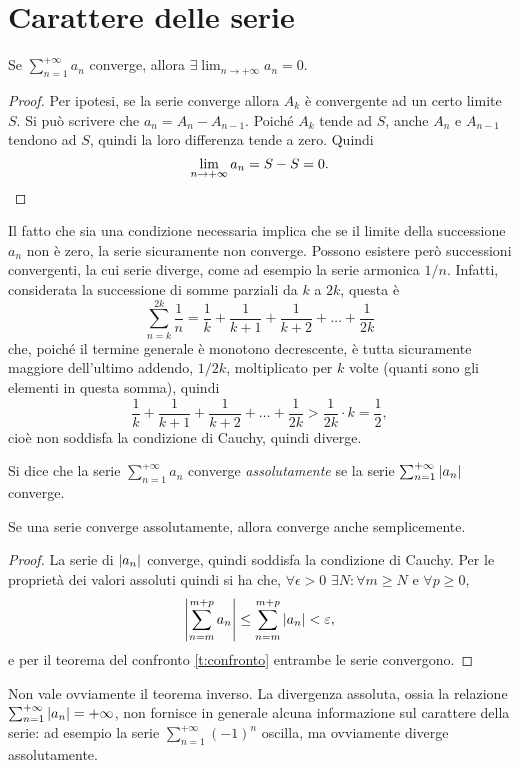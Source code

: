 \section{Carattere delle serie}
\begin{teorema}
Se $\sum_{n=1}^{+\infty}a_n$ converge, allora $\exists\lim_{n\to+\infty}a_n=0$.
\end{teorema}
\begin{proof}
Per ipotesi, se la serie converge allora $A_k$ è convergente ad un certo limite $S$. Si può scrivere che $a_n=A_n-A_{n-1}$. Poiché $A_k$ tende ad $S$, anche $A_n$ e $A_{n-1}$ tendono ad $S$, quindi la loro differenza tende a zero. Quindi
\[
\lim_{n\to+\infty}a_n=S-S=0.\qedhere
\]
\end{proof}
Il fatto che sia una condizione necessaria implica che se il limite della successione $a_n$ non è zero, la serie sicuramente non converge. Possono esistere però successioni convergenti, la cui serie diverge, come ad esempio la serie armonica $1/n$. Infatti, considerata la successione di somme parziali da $k$ a $2k$, questa è
\[
\sum_{n=k}^{2k}\frac1{n}=\frac1{k}+\frac1{k+1}+\frac1{k+2}+\dots+\frac1{2k}
\]
che, poiché il termine generale è monotono decrescente, è tutta sicuramente maggiore dell'ultimo addendo, $1/2k$, moltiplicato per $k$ volte (quanti sono gli elementi in questa somma), quindi
\[
\frac1{k}+\frac1{k+1}+\frac1{k+2}+\dots+\frac1{2k}>\frac1{2k}\cdot k=\frac12,
\]
cioè non soddisfa la condizione di Cauchy, quindi diverge.
\begin{definizione}
\label{d:conv_assoluta}
Si dice che la serie $\sum_{n=1}^{+\infty}a_n$ converge \emph{assolutamente} se la serie $\sum_{n=1}^{+\infty}\left|{a_n}\right|$ converge.
\end{definizione}
\begin{teorema}
Se una serie converge assolutamente, allora converge anche semplicemente.
\end{teorema}
\begin{proof}
La serie di $\left|{a_n}\right|$ converge, quindi soddisfa la condizione di Cauchy. Per le proprietà dei valori assoluti quindi si ha che, $\forall\epsilon>0$ $\exists N\colon\forall m\geq N$ e $\forall p\geq 0$,
\[
\left|{\sum_{n=m}^{m+p}a_n}\right|\leq\sum_{n=m}^{m+p}\left|{a_n}\right|<\varepsilon,
\]
e per il teorema del confronto \ref{t:confronto} entrambe le serie convergono.
\end{proof}
Non vale ovviamente il teorema inverso. La divergenza assoluta, ossia la relazione $\sum_{n=1}^{+\infty}\left|{a_n}\right|=+\infty$, non fornisce in generale alcuna informazione sul carattere della serie: ad esempio la serie $\sum_{n=1}^{+\infty}(-1)^n$ oscilla, ma ovviamente diverge assolutamente.

